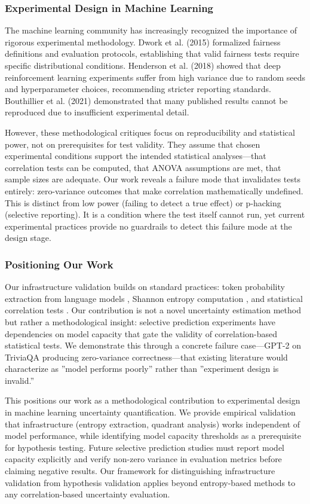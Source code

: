 \subsubsection{Experimental Design in Machine Learning}

The machine learning community has increasingly recognized the importance of rigorous experimental methodology. Dwork et al. (2015) formalized fairness definitions and evaluation protocols, establishing that valid fairness tests require specific distributional conditions. Henderson et al. (2018) showed that deep reinforcement learning experiments suffer from high variance due to random seeds and hyperparameter choices, recommending stricter reporting standards. Bouthillier et al. (2021) demonstrated that many published results cannot be reproduced due to insufficient experimental detail.

However, these methodological critiques focus on reproducibility and statistical power, not on prerequisites for test validity. They assume that chosen experimental conditions support the intended statistical analyses---that correlation tests can be computed, that ANOVA assumptions are met, that sample sizes are adequate. Our work reveals a failure mode that invalidates tests entirely: zero-variance outcomes that make correlation mathematically undefined. This is distinct from low power (failing to detect a true effect) or p-hacking (selective reporting). It is a condition where the test itself cannot run, yet current experimental practices provide no guardrails to detect this failure mode at the design stage.

\subsubsection{Positioning Our Work}

Our infrastructure validation builds on standard practices: token probability extraction from language models \citep{Hendrycks2017}, Shannon entropy computation \citep{Shannon1948}, and statistical correlation tests \citep{Spearman1904}. Our contribution is not a novel uncertainty estimation method but rather a methodological insight: selective prediction experiments have dependencies on model capacity that gate the validity of correlation-based statistical tests. We demonstrate this through a concrete failure case---GPT-2 on TriviaQA producing zero-variance correctness---that existing literature would characterize as ''model performs poorly'' rather than ''experiment design is invalid.''

This positions our work as a methodological contribution to experimental design in machine learning uncertainty quantification. We provide empirical validation that infrastructure (entropy extraction, quadrant analysis) works independent of model performance, while identifying model capacity thresholds as a prerequisite for hypothesis testing. Future selective prediction studies must report model capacity explicitly and verify non-zero variance in evaluation metrics before claiming negative results. Our framework for distinguishing infrastructure validation from hypothesis validation applies beyond entropy-based methods to any correlation-based uncertainty evaluation.
